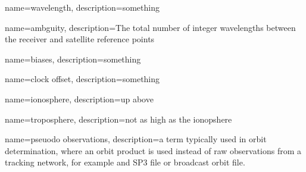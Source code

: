 {
	name=wavelength,
	description={something}
}

{
	name=ambguity,
	description={The total number of integer wavelengths between the receiver and satellite reference points}
}

{
	name=biases,
	description={something}
}

{
	name=clock offset,
	description={something}
}

{
	name=ionosphere,
	description={up above}
}

{
	name=troposphere,
	description={not as high as the ionopshere}
}

{
	name=pseuodo observations,
	description={a term typically used in orbit determination, where an orbit product is used instead of raw observations from a tracking network, for example and SP3 file or broadcast orbit file.}
}




